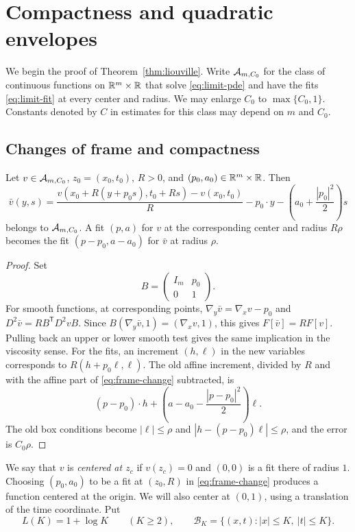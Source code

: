 \section{Compactness and quadratic envelopes}\label{sec:limiting-tools}

We begin the proof of Theorem~\ref{thm:liouville}. Write
$\mathcal{A}_{m,C_0}$ for the class of continuous functions on
$\mathbb{R}^m\times\mathbb{R}$ that solve \eqref{eq:limit-pde} and have the fits
\eqref{eq:limit-fit} at every center and radius. We may enlarge $C_0$ to
$\max\{C_0,1\}$. Constants denoted by $C$ in estimates for this class
may depend on $m$ and $C_0$.

\subsection{Changes of frame and compactness}

\begin{lemma}\label{lem:frame-invariance}
Let $v\in\mathcal{A}_{m,C_0}$, $z_0=(x_0,t_0)$, $R>0$, and
$(p_0,a_0)\in\mathbb{R}^m\times\mathbb{R}$. Then
\begin{equation}\label{eq:frame-change}
  \bar v(y,s)=
  \frac{v(x_0+R(y+p_0s),t_0+Rs)-v(x_0,t_0)}{R}
       -p_0\cdot y-\left(a_0+\frac{|p_0|^2}{2}\right)s
\end{equation}
belongs to $\mathcal{A}_{m,C_0}$. A fit $(p,a)$ for $v$ at the
corresponding center and radius $R\rho$ becomes the fit
$(p-p_0,a-a_0)$ for $\bar v$ at radius $\rho$.
\end{lemma}

\begin{proof}
Set
\[
  B=\begin{pmatrix}I_m&p_0\\0&1\end{pmatrix}.
\]
For smooth functions, at corresponding points,
$\nabla_y\bar v=\nabla_xv-p_0$ and
$D^2\bar v=R B^{\mathsf T}D^2vB$. Since
$B(\nabla_y\bar v,1)=(\nabla_xv,1)$, this gives
$F[\bar v]=R F[v]$. Pulling back an upper or lower smooth test gives
the same implication in the viscosity sense. For the fits, an
increment $(h,\ell)$ in the new variables corresponds to
$R(h+p_0\ell,\ell)$. The old affine increment, divided by $R$ and
with the affine part of \eqref{eq:frame-change} subtracted, is
\[
  (p-p_0)\cdot h+
  \left(a-a_0-\frac{|p-p_0|^2}{2}\right)\ell.
\]
The old box conditions become
$|\ell|\le\rho$ and $|h-(p-p_0)\ell|\le\rho$, and the error is
$C_0\rho$.
\end{proof}

We say that $v$ is \emph{centered at $z_c$} if $v(z_c)=0$ and
$(0,0)$ is a fit there of radius $1$. Choosing $(p_0,a_0)$ to be a
fit at $(z_0,R)$ in \eqref{eq:frame-change} produces a function
centered at the origin. We will also center at $(0,1)$, using a
translation of the time coordinate. Put
\[
  L(K)=1+\log K\qquad(K\ge2),\qquad
  \mathcal B_K=\{(x,t):|x|\le K,\ |t|\le K\}.
\]

